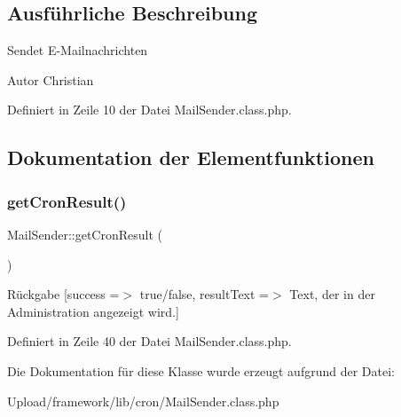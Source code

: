 \subsection{Ausführliche Beschreibung}
Sendet E-\/\+Mailnachrichten \begin{DoxyAuthor}{Autor}
Christian 
\end{DoxyAuthor}


Definiert in Zeile 10 der Datei Mail\+Sender.\+class.\+php.



\subsection{Dokumentation der Elementfunktionen}
\mbox{\label{class_mail_sender_ae995eb754b07488071eaa375b383c1b9}} 
\subsubsection{\texorpdfstring{get\+Cron\+Result()}{getCronResult()}}
{\footnotesize\ttfamily Mail\+Sender\+::get\+Cron\+Result (\begin{DoxyParamCaption}{ }\end{DoxyParamCaption})}

\begin{DoxyReturn}{Rückgabe}
\mbox{[}\textquotesingle{}success\textquotesingle{} =$>$ \textquotesingle{}true/false\textquotesingle{}, \textquotesingle{}result\+Text\textquotesingle{} =$>$ \textquotesingle{}Text, der in der Administration angezeigt wird.\textquotesingle{}\mbox{]} 
\end{DoxyReturn}


Definiert in Zeile 40 der Datei Mail\+Sender.\+class.\+php.



Die Dokumentation für diese Klasse wurde erzeugt aufgrund der Datei\+:\begin{DoxyCompactItemize}
\item 
Upload/framework/lib/cron/Mail\+Sender.\+class.\+php\end{DoxyCompactItemize}
